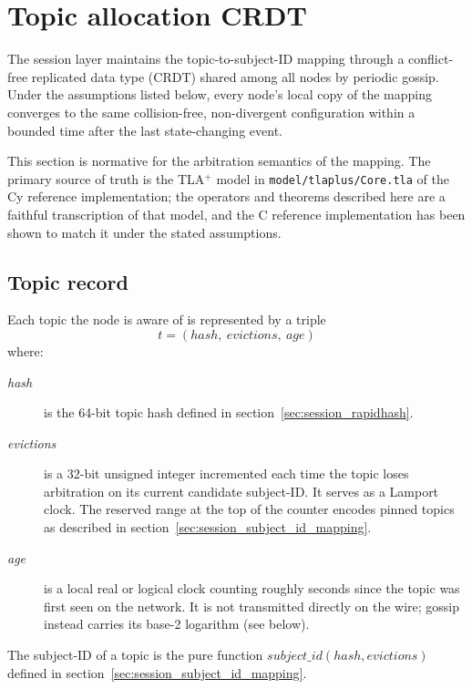 \section{Topic allocation CRDT}\label{sec:session_crdt}

The session layer maintains the topic-to-subject-ID mapping through a conflict-free
replicated data type (CRDT) shared among all nodes by periodic gossip.
Under the assumptions listed below, every node's local copy of the mapping converges
to the same collision-free, non-divergent configuration within a bounded time after
the last state-changing event.

This section is normative for the arbitration semantics of the mapping.
The primary source of truth is the TLA$^+$ model in \texttt{model/tlaplus/Core.tla}
of the Cy reference implementation; the operators and theorems described here are
a faithful transcription of that model, and the C reference implementation has been
shown to match it under the stated assumptions.

\subsection{Topic record}

Each topic the node is aware of is represented by a triple
\[
    t = (\mathit{hash},\ \mathit{evictions},\ \mathit{age})
\]
where:

\begin{description}
    \item[\textit{hash}] is the 64-bit topic hash defined in
    section~\ref{sec:session_rapidhash}.
    \item[\textit{evictions}] is a 32-bit unsigned integer incremented each time the
    topic loses arbitration on its current candidate subject-ID. It serves as a
    Lamport clock. The reserved range at the top of the counter encodes pinned
    topics as described in section~\ref{sec:session_subject_id_mapping}.
    \item[\textit{age}] is a local real or logical clock counting roughly seconds
    since the topic was first seen on the network. It is not transmitted directly
    on the wire; gossip instead carries its base-2 logarithm (see below).
\end{description}

The subject-ID of a topic is the pure function
$\mathit{subject\_id}(\mathit{hash}, \mathit{evictions})$ defined in
section~\ref{sec:session_subject_id_mapping}.

